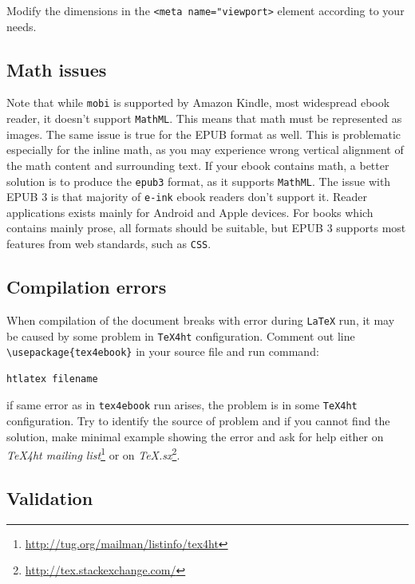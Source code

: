 Modify the dimensions in the
\texttt{\textless{}meta\ name="viewport\textgreater{}} element according
to your needs.

\hypertarget{math-issues}{%
\subsection{Math issues}\label{math-issues}}

Note that while \texttt{mobi} is supported by Amazon Kindle, most
widespread ebook reader, it doesn't support \texttt{MathML}. This means
that math must be represented as images. The same issue is true for the
EPUB format as well. This is problematic especially for the inline math,
as you may experience wrong vertical alignment of the math content and
surrounding text. If your ebook contains math, a better solution is to
produce the \texttt{epub3} format, as it supports \texttt{MathML}. The
issue with EPUB 3 is that majority of \texttt{e-ink} ebook readers don't
support it. Reader applications exists mainly for Android and Apple
devices. For books which contains mainly prose, all formats should be
suitable, but EPUB 3 supports most features from web standards, such as
\texttt{CSS}.

\hypertarget{compilation-errors}{%
\subsection{Compilation errors}\label{compilation-errors}}

When compilation of the document breaks with error during \texttt{LaTeX}
run, it may be caused by some problem in \texttt{TeX4ht} configuration.
Comment out line \texttt{\textbackslash{}usepackage\{tex4ebook\}} in
your source file and run command:

\begin{verbatim}
htlatex filename 
\end{verbatim}

if same error as in \texttt{tex4ebook} run arises, the problem is in
some \texttt{TeX4ht} configuration. Try to identify the source of
problem and if you cannot find the solution, make minimal example
showing the error and ask for help either on \emph{TeX4ht mailing
list}\footnote{\url{http://tug.org/mailman/listinfo/tex4ht}} or on
\emph{TeX.sx}\footnote{\url{http://tex.stackexchange.com/}}.

\hypertarget{validation}{%
\subsection{Validation}\label{validation}}

